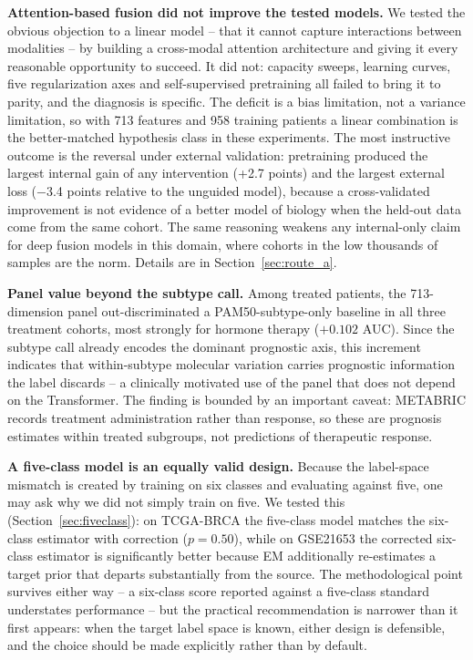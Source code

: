 \documentclass[10pt,journal,compsoc,twocolumn]{IEEEtran}
\begin{document}
\textbf{Attention-based fusion did not improve the tested models.} We tested the obvious objection to a linear model -- that it cannot capture interactions between modalities -- by building a cross-modal attention architecture and giving it every reasonable opportunity to succeed. It did not: capacity sweeps, learning curves, five regularization axes and self-supervised pretraining all failed to bring it to parity, and the diagnosis is specific. The deficit is a bias limitation, not a variance limitation, so with 713 features and 958 training patients a linear combination is the better-matched hypothesis class in these experiments. The most instructive outcome is the reversal under external validation: pretraining produced the largest internal gain of any intervention (+2.7 points) and the largest external loss ($-$3.4 points relative to the unguided model), because a cross-validated improvement is not evidence of a better model of biology when the held-out data come from the same cohort. The same reasoning weakens any internal-only claim for deep fusion models in this domain, where cohorts in the low thousands of samples are the norm. Details are in Section~\ref{sec:route_a}.

\textbf{Panel value beyond the subtype call.} Among treated patients, the 713-dimension panel out-discriminated a PAM50-subtype-only baseline in all three treatment cohorts, most strongly for hormone therapy ($+0.102$ AUC). Since the subtype call already encodes the dominant prognostic axis, this increment indicates that within-subtype molecular variation carries prognostic information the label discards -- a clinically motivated use of the panel that does not depend on the Transformer. The finding is bounded by an important caveat: METABRIC records treatment administration rather than response, so these are prognosis estimates within treated subgroups, not predictions of therapeutic response.

\textbf{A five-class model is an equally valid design.} Because the label-space mismatch is created by training on six classes and evaluating against five, one may ask why we did not simply train on five. We tested this (Section~\ref{sec:fiveclass}): on TCGA-BRCA the five-class model matches the six-class estimator with correction ($p = 0.50$), while on GSE21653 the corrected six-class estimator is significantly better because EM additionally re-estimates a target prior that departs substantially from the source. The methodological point survives either way -- a six-class score reported against a five-class standard understates performance -- but the practical recommendation is narrower than it first appears: when the target label space is known, either design is defensible, and the choice should be made explicitly rather than by default.
\end{document}
